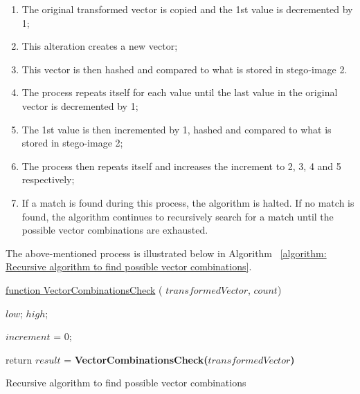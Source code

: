 \begin{enumerate}[label=\roman*.]
    \item The original transformed vector is copied and the 1st value is decremented by 1;
    \item This alteration creates a new vector;
    \item This vector is then hashed and compared to what is stored in stego-image 2.
    \item The process repeats itself for each value until the last value in the original vector is decremented by 1;
    \item The 1st value is then incremented by 1, hashed and compared to what is stored in stego-image 2;
    \item The process then repeats itself and increases the increment to 2, 3, 4 and 5 respectively;
    \item If a match is found during this process, the algorithm is halted. If no match is found, the algorithm continues to recursively search for a match until the possible vector combinations are exhausted.
\end{enumerate}

The above-mentioned process is illustrated below in Algorithm ~\ref{algorithm: Recursive algorithm to find possible vector combinations}.

\begin{algorithm}
     
     \underline{function VectorCombinationsCheck} ( $transformedVector$, $count$)\;
     
      $low$;
      $high$;
     
     $increment$ = 0;
     
     
     
     return $result$ = \textbf{VectorCombinationsCheck($transformedVector$)}
     
     \label{algorithm: Recursive algorithm to find possible vector combinations}
     \caption{Recursive algorithm to find possible vector combinations}
\end{algorithm}


